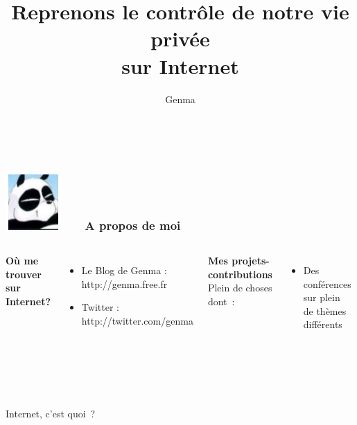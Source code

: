 \documentclass{beamer}
\title[Reprenons le contrôle de notre vie privée sur Internet]{Reprenons le contrôle de notre vie privée \\sur Internet}
\author{Genma}
\begin{document}
\begin{frame}
	\titlepage
	\vfill
	\begin{center}
		\\[2.5ex]
		{\tiny\CcNote{\CcLongnameByNcSa}}
		\vspace*{-2.5ex}
	\end{center}
\end{frame}

\begin{frame}
\frametitle{\includegraphics[scale=0.4]{./images/Genma.jpg} \ \ \  A propos de moi  }
\begin{columns}[c] 
\textbf{Où me trouver sur Internet?}
\begin{itemize}
\item Le Blog de Genma : http://genma.free.fr
\item Twitter : http://twitter.com/genma
\end{itemize}
\textbf{Mes projets-contributions}
\\ Plein de choses dont :
\begin{itemize}
\item Des conférences sur plein de thèmes différents
\end{itemize}
\includegraphics[width=5cm,height=5cm]{./images/blog.png} 
\end{columns}
\end{frame}

\begin{frame}
\begin{center}
\Huge{Internet, c'est quoi ?}
\end{center}
\end{frame}
\end{document}

